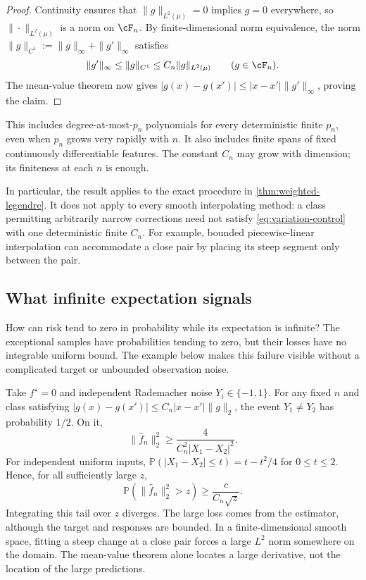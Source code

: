 \documentclass[11pt,twoside]{article}
\renewcommand{\P}{\mathbb P}
\theoremstyle{definition}
\theoremstyle{remark}
\begin{document}
\begin{proof}
Continuity ensures that $\|g\|_{L^2(\mu)}=0$ implies $g=0$ everywhere, so
$\|\cdot\|_{L^2(\mu)}$ is a norm on $\cF_n$. By finite-dimensional norm
equivalence, the norm $\|g\|_{C^1}:=\|g\|_\infty+\|g'\|_\infty$ satisfies
\[
 \|g'\|_\infty\le\|g\|_{C^1}\le C_n\|g\|_{L^2(\mu)}
 \qquad(g\in\cF_n).
\]
The mean-value theorem now gives
$|g(x)-g(x')|\le|x-x'|\|g'\|_\infty$, proving the claim.
\end{proof}

This includes degree-at-most-$p_n$ polynomials for
every deterministic finite $p_n$, even when $p_n$ grows very rapidly with
$n$. It also includes finite spans of fixed continuously differentiable
features. The constant $C_n$ may grow with dimension; its finiteness at each
$n$ is enough.

In particular, the result applies to the exact procedure in
\cref{thm:weighted-legendre}. It does not apply to every smooth interpolating
method: a class permitting arbitrarily narrow corrections need not satisfy
\cref{eq:variation-control} with one deterministic finite $C_n$.
For example, bounded piecewise-linear interpolation can accommodate a close
pair by placing its steep segment only between the pair.

\subsection{What infinite expectation signals}

How can risk tend to zero in probability while its expectation is infinite?
The exceptional samples have probabilities tending to zero, but
their losses have no integrable uniform bound. The example below makes this
failure visible without a complicated target or unbounded observation noise.

Take $f^\star=0$ and independent Rademacher noise $Y_i\in\{-1,1\}$.
For any fixed $n$ and class satisfying
$|g(x)-g(x')|\le C_n|x-x'|\|g\|_2$, the event
$Y_1\ne Y_2$ has probability $1/2$. On it,
\[
 \|\widehat f_n\|_2^2\ge\frac4{C_n^2|X_1-X_2|^2}.
\]
For independent uniform inputs,
$\P(|X_1-X_2|\le t)=t-t^2/4$ for $0\le t\le2$.
Hence, for all sufficiently large $z$,
\[
 \P(\|\widehat f_n\|_2^2>z)\ge \frac{c}{C_n\sqrt z}.
\]
Integrating this tail over $z$ diverges. The large loss comes from the
estimator, although the target and responses are bounded. In a
finite-dimensional smooth space, fitting a steep change at a close pair
forces a large $L^2$ norm somewhere on the domain. The mean-value theorem
alone locates a large derivative, not the location of the large predictions.
\end{document}
